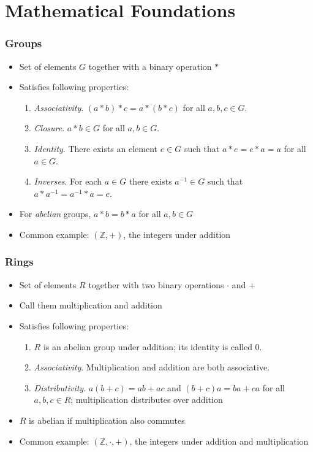 \section{Mathematical Foundations}
\begin{frame}
\frametitle{Groups}
\begin{itemize}
  \item Set of elements $G$ together with a binary operation $*$
  \item Satisfies following properties:
  \begin{enumerate}
    \item \emph{Associativity}. $(a * b) * c = a * (b * c)$ for all $a, b, c \in G$.
    \item \emph{Closure}. $a * b \in G$ for all $a, b \in G$.
    \item \emph{Identity}. There exists an element $e \in G$ such that $a * e = e * a = a$ for all $a \in G$.  
    \item \emph{Inverses}. For each $a \in G$ there exists $a^{-1} \in G$ such that $a * a^{-1} = a^{-1} * a = e$.
  \end{enumerate}
  \vfill
  \item For \emph{abelian} groups, $a * b = b * a$ for all $a, b \in G$
  \item Common example: $(\mathbb{Z}, +)$, the integers under addition
\end{itemize}
\end{frame}

\begin{frame}
\frametitle{Rings}
\begin{itemize}
  \item Set of elements $R$ together with two binary operations $\cdot$ and $+$
  \item Call them multiplication and addition
  \item Satisfies following properties:
  \begin{enumerate}
    \item $R$ is an abelian group under addition; its identity is called $0$.
    \item \emph{Associativity}. Multiplication and addition are both associative. 
    \item \emph{Distributivity}. $a(b+c) = ab + ac$ and $(b+c)a = ba + ca$ for all $a,b,c \in R$; multiplication distributes over addition
  \end{enumerate}
  \vfill
  \item $R$ is abelian if multiplication also commutes
  \item Common example: $(\mathbb{Z}, \cdot, +)$, the integers under addition and multiplication
\end{itemize}
\end{frame}

